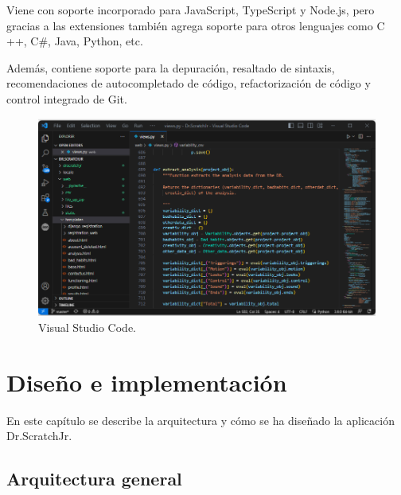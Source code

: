 \documentclass[a4paper, 12pt]{book}
\begin{document}
\vspace{5mm}
Viene con soporte incorporado para JavaScript, TypeScript y Node.js, pero gracias a las extensiones también agrega soporte para otros lenguajes como C ++, C\#, Java, Python, etc.

\vspace{5mm}
Además, contiene soporte para la depuración, resaltado de sintaxis, recomendaciones de autocompletado de código, refactorización de código y control integrado de Git.

\begin{figure}[ht]
  \centering
  \includegraphics[width=16cm, keepaspectratio]{img/visualstudiocode.png}
  \caption{Visual Studio Code.}\label{fig:visualstudiocode}
\end{figure}



\cleardoublepage
\chapter{Diseño e implementación}
\label{chap:implementacion}

En este capítulo se describe la arquitectura y cómo se ha diseñado la aplicación Dr.ScratchJr.

\section{Arquitectura general} 
\label{sec:arquitectura}
\end{document}
